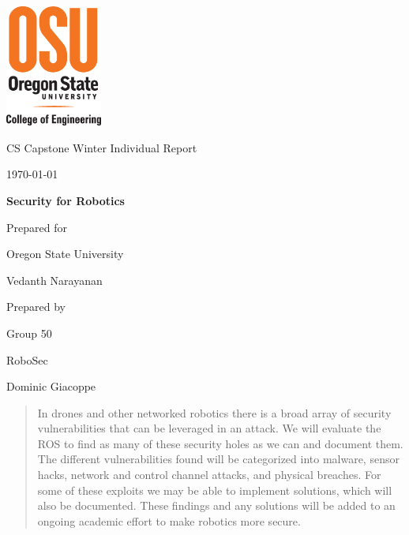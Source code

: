 \documentclass[IEEEtran,letterpaper,10pt,notitlepage,draftclsnofoot,onecolumn]{article}
\def \CapstoneTeamName{   RoboSec}
\def \CapstoneTeamNumber{   50}
\def \GroupMemberThree{     Dominic Giacoppe}
\def \CapstoneProjectName{    Security for Robotics}
\def \CapstoneSponsorCompany{ Oregon State University}
\def \CapstoneSponsorPerson{    Vedanth Narayanan}
\def \DocType{    %
        Winter Individual Report
        }
\newcommand{\NameSigPair}[1]{\par
\makebox[2.75in][r]{#1} \hfil   \makebox[3.25in]{\makebox[2.25in]{\hrulefill} \hfill    \makebox[.75in]{\hrulefill}}
\par\vspace{-12pt} \textit{\tiny\noindent
\makebox[2.75in]{} \hfil    \makebox[3.25in]{\makebox[2.25in][r]{Signature} \hfill  \makebox[.75in][r]{Date}}}}
\renewcommand{\NameSigPair}[1]{#1}
\begin{document}
\begin{titlepage}
    \begin{singlespace}
      \includegraphics[height=4cm]{coe_v_spot1}
        \hfill
        \par\vspace{.2in}
        \centering
        \scshape{
            \huge CS Capstone \DocType \par
            {\large\today}\par
            \vspace{.5in}
            \textbf{\Huge\CapstoneProjectName}\par
            \vfill
            {\large Prepared for}\par
            \Huge \CapstoneSponsorCompany\par
            \vspace{10pt}
            {\Large\NameSigPair{\CapstoneSponsorPerson}\par}
            {\large Prepared by }\par
            Group\CapstoneTeamNumber\par
            \CapstoneTeamName\par
            \vspace{10pt}
            {\Large
                \NameSigPair{\GroupMemberThree}\par
            }
            \vspace{20pt}
        }
        \begin{abstract}
          In drones and other networked robotics there is a broad array of security vulnerabilities that can be leveraged in an attack.
          We will evaluate the ROS to find as many of these security holes as we can and document them.
          The different vulnerabilities found will be categorized into malware, sensor hacks, network and control channel attacks, and physical breaches.
          For some of these exploits we may be able to implement solutions, which will also be documented.
          These findings and any solutions will be added to an ongoing academic effort to make robotics more secure.
        \end{abstract}
    \end{singlespace}
\end{titlepage}
\end{document}
